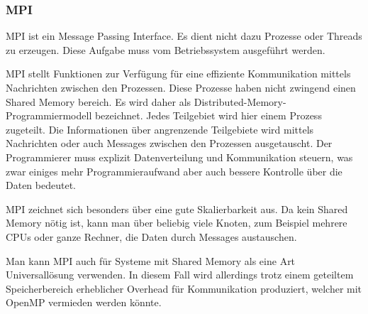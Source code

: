 \subsubsection{MPI}
MPI ist ein Message Passing Interface.
Es dient nicht dazu Prozesse oder Threads zu erzeugen.
Diese Aufgabe muss vom Betriebssystem ausgeführt werden.

MPI stellt Funktionen zur Verfügung für eine effiziente Kommunikation mittels Nachrichten zwischen den Prozessen.
Diese Prozesse haben nicht zwingend einen Shared Memory bereich.
Es wird daher als Distributed-Memory-Programmiermodell bezeichnet.
Jedes Teilgebiet wird hier einem Prozess zugeteilt.
Die Informationen über angrenzende Teilgebiete wird mittels Nachrichten oder auch Messages zwischen den Prozessen ausgetauscht.
Der Programmierer muss explizit Datenverteilung und Kommunikation steuern, was zwar einiges mehr Programmieraufwand aber auch bessere Kontrolle über die Daten bedeutet.

MPI zeichnet sich besonders über eine gute Skalierbarkeit aus.
Da kein Shared Memory nötig ist, kann man über beliebig viele Knoten, zum Beispiel mehrere CPUs oder ganze Rechner, die Daten durch Messages austauschen.

Man kann MPI auch für Systeme mit Shared Memory als eine Art Universallösung verwenden.
In diesem Fall wird allerdings trotz einem geteiltem Speicherbereich erheblicher Overhead für Kommunikation produziert, welcher mit OpenMP vermieden werden könnte.
